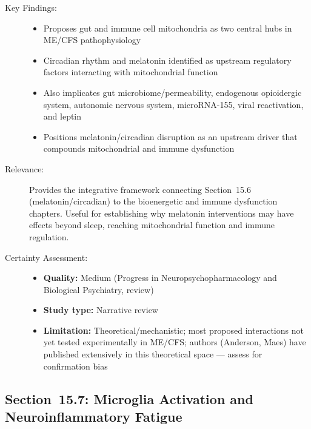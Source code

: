 \begin{description}
    \item[Key Findings:]
    \begin{itemize}
        \item Proposes gut and immune cell mitochondria as two central hubs in ME/CFS pathophysiology
        \item Circadian rhythm and melatonin identified as upstream regulatory factors interacting with mitochondrial function
        \item Also implicates gut microbiome/permeability, endogenous opioidergic system, autonomic nervous system, microRNA-155, viral reactivation, and leptin
        \item Positions melatonin/circadian disruption as an upstream driver that compounds mitochondrial and immune dysfunction
    \end{itemize}
    \item[Relevance:] Provides the integrative framework connecting Section~15.6 (melatonin/circadian) to the bioenergetic and immune dysfunction chapters. Useful for establishing why melatonin interventions may have effects beyond sleep, reaching mitochondrial function and immune regulation.
    \item[Certainty Assessment:]
    \begin{itemize}
        \item \textbf{Quality:} Medium (Progress in Neuropsychopharmacology and Biological Psychiatry, review)
        \item \textbf{Study type:} Narrative review
        \item \textbf{Limitation:} Theoretical/mechanistic; most proposed interactions not yet tested experimentally in ME/CFS; authors (Anderson, Maes) have published extensively in this theoretical space --- assess for confirmation bias
    \end{itemize}
\end{description}


\subsection*{Section~15.7: Microglia Activation and Neuroinflammatory Fatigue}


